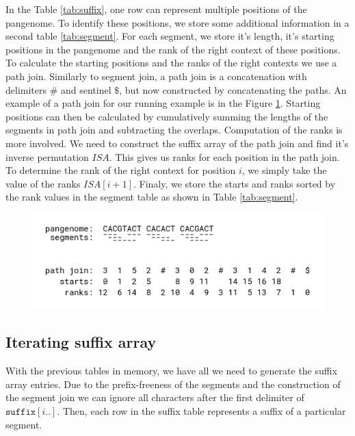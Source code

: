 \documentclass[twocolumn]{ceurart}
\begin{document}


In the Table \ref{tab:suffix}, one row can represent multiple positions of the
pangenome.
To identify these positions, we store some additional information in a second
table \ref{tab:segment}.
For each segment, we store it's length, it's starting positions in the pangenome
and the rank of the right context of these positions.
To calculate the starting positions and the ranks of the right contexts we use
a path join.
Similarly to segment join, a path join is a concatenation with delimiters $\#$
and sentinel $\$$, but now constructed by concatenating the paths.
An example of a path join for our running example is in the Figure \ref{fig:path_join}.
Starting positions can then be calculated by cumulatively summing the lengths
of the segments in path join and subtracting the overlaps.
Computation of the ranks is more involved.
We need to construct the suffix array of the path join and find it's inverse
permutation $ISA$.
This gives us ranks for each position in the path join.
To determine the rank of the right context for position $i$, we simply take
the value of the ranks $ISA[i+1]$.
Finaly, we store the starts and ranks sorted by the rank values in the segment
table as shown in Table \ref{tab:segment}.

\begin{figure}
    \centering
    \includegraphics[width=\linewidth]{images/path_join.png}
    \caption{}
    \label{fig:path_join}
\end{figure}



\subsection{Iterating suffix array}
With the previous tables in memory, we have all we need to generate the suffix
array entries.
Due to the prefix-freeness of the segments and the construction of the segment join
we can ignore all characters after the first delimiter of $\texttt{suffix}[i..]$.
Then, each row in the suffix table represents a suffix of a particular segment.
\end{document}
